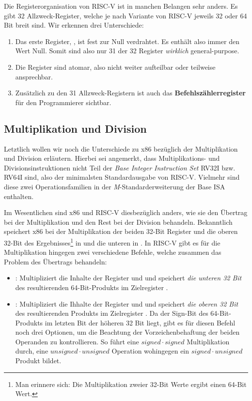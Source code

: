 Die Registerorganisation von RISC-V ist in manchen Belangen sehr anders. Es gibt
32 Allzweck-Register, welche je nach Variante von RISC-V jeweils 32 oder
64 Bit breit sind. Wir erkennen drei Unterschiede:

\begin{enumerate}
  \item Das erste Register, , ist fest zur Null verdrahtet. Es enthält
    also immer den Wert Null. Somit sind also nur 31 der 32 Register
    \emph{wirklich} general-purpose.
  \item Die Register sind atomar, also nicht weiter aufteilbar oder teilweise
    ansprechbar.
  \item Zusätzlich zu den 31 Allzweck-Registern ist auch das
    \textbf{Befehlszählerregister}  für den Programmierer sichtbar.
\end{enumerate}

\subsection{Multiplikation und Division}

Letztlich wollen wir noch die Unterschiede zu x86 bezüglich der Multiplikation
und Division erläutern. Hierbei sei angemerkt, dass Multiplikations- und
Divisionsinstruktionen nicht Teil der \emph{Base Integer Instruction Set} RV32I
bzw. RV64I sind, also der minimalsten Standardausgabe von RISC-V. Vielmehr sind
diese zwei Operationsfamilien in der \emph{M}-Standarderweiterung der Base ISA
enthalten.

Im Wesentlichen sind x86 und RISC-V diesbezüglich anders, wie sie den Übertrag bei
der Multiplikation und den Rest bei der Division behandeln. Bekanntlich
speichert x86 bei der Multiplikation der beiden 32-Bit Register  und
 die oberen 32-Bit des Ergebnisses\footnote{Man erinnere sich: Die
  Multiplikation zweier 32-Bit Werte ergibt einen 64-Bit Wert.} in 
und die unteren in . In RISC-V gibt es für die Multiplikation hingegen
zwei verschiedene Befehle, welche zusammen das Problem des Übertrags behandeln:

\begin{itemize}
  \item {}: Multipliziert die Inhalte der Register
     und  und speichert \emph{die unteren 32 Bit} des
    resultierenden 64-Bit-Produkts im Zielregister .
  \item {}: Multipliziert die Ihhalte der Register
     und  und speichert \emph{die oberen 32 Bit} des
    resultierenden Produkts im Zielregister . Da der Sign-Bit des
    64-Bit-Produkts im letzten Bit der höheren 32 Bit liegt, gibt es für diesen
    Befehl noch drei Optionen, um die Beachtung der Vorzeichenbehaftung der
    beiden Operanden zu kontrollieren. So führt  eine
    $signed \cdot signed$ Multiplikation durch, 
    eine $unsigned \cdot unsigned$ Operation wohingegen
     ein $signed \cdot unsigned$ Produkt bildet.
\end{itemize}

